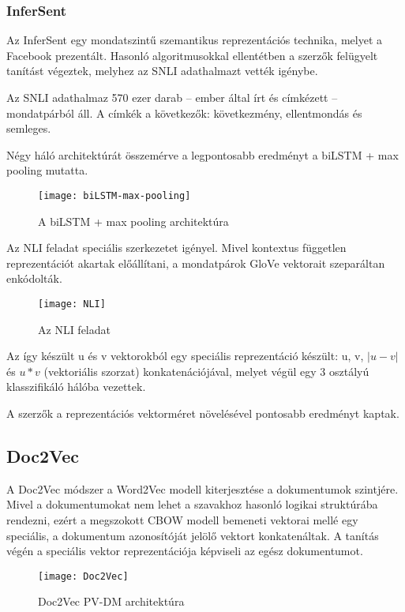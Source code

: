 \subsubsection{InferSent}
Az InferSent egy mondatszintű szemantikus reprezentációs technika, melyet a Facebook prezentált. Hasonló algoritmusokkal ellentétben a szerzők felügyelt tanítást végeztek, melyhez az SNLI adathalmazt vették igénybe.

Az SNLI adathalmaz 570 ezer darab – ember által írt és címkézett – mondatpárból áll. A címkék a következők: következmény, ellentmondás és semleges.

Négy háló architektúrát összemérve a legpontosabb eredményt a biLSTM + max pooling mutatta. 

\begin{figure}[H]
	\centering
	\texttt{[image: biLSTM-max-pooling]}
	\caption{A biLSTM + max pooling architektúra}
\end{figure}

Az NLI feladat speciális szerkezetet igényel. Mivel kontextus független reprezentációt akartak előállítani, a mondatpárok GloVe vektorait szeparáltan enkódolták.

\begin{figure}[H]
	\centering
	\texttt{[image: NLI]}
	\caption{Az NLI feladat}
\end{figure}

Az így készült u és v vektorokból egy speciális reprezentáció készült: u, v, $\left| u - v \right|$ és $u \ast v$ (vektoriális szorzat) konkatenációjával, melyet végül egy 3 osztályú klasszifikáló hálóba vezettek.

\begin{note}
	A szerzők a reprezentációs vektorméret növelésével pontosabb eredményt kaptak.
\end{note}

\subsection{Doc2Vec}
A Doc2Vec módszer a Word2Vec modell kiterjesztése a dokumentumok szintjére. Mivel a dokumentumokat nem lehet a szavakhoz hasonló logikai struktúrába rendezni, ezért a megszokott CBOW modell bemeneti vektorai mellé egy speciális, a dokumentum azonosítóját jelölő vektort konkatenáltak. A tanítás végén a speciális vektor reprezentációja képviseli az egész dokumentumot.

\begin{figure}[H]
	\centering
	\texttt{[image: Doc2Vec]}
	\caption{Doc2Vec PV-DM architektúra}
\end{figure}


